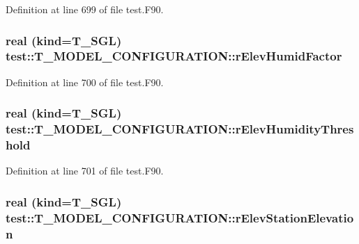 Definition at line 699 of file test.F90.

\hypertarget{typetest_1_1_t___m_o_d_e_l___c_o_n_f_i_g_u_r_a_t_i_o_n_abf728571c92516aee194d82c9bd9017e}{
\subsubsection[{rElevHumidFactor}]{\setlength{\rightskip}{0pt plus 5cm}real (kind={\bf T\_\-SGL}) {\bf test::T\_\-MODEL\_\-CONFIGURATION::rElevHumidFactor}}}
\label{typetest_1_1_t___m_o_d_e_l___c_o_n_f_i_g_u_r_a_t_i_o_n_abf728571c92516aee194d82c9bd9017e}


Definition at line 700 of file test.F90.

\hypertarget{typetest_1_1_t___m_o_d_e_l___c_o_n_f_i_g_u_r_a_t_i_o_n_ace5e03b5eb7f036eb315d329cb80d238}{
\subsubsection[{rElevHumidityThreshold}]{\setlength{\rightskip}{0pt plus 5cm}real (kind={\bf T\_\-SGL}) {\bf test::T\_\-MODEL\_\-CONFIGURATION::rElevHumidityThreshold}}}
\label{typetest_1_1_t___m_o_d_e_l___c_o_n_f_i_g_u_r_a_t_i_o_n_ace5e03b5eb7f036eb315d329cb80d238}


Definition at line 701 of file test.F90.

\hypertarget{typetest_1_1_t___m_o_d_e_l___c_o_n_f_i_g_u_r_a_t_i_o_n_a193e6b6383fe1b9dfdef433889a4ca46}{
\subsubsection[{rElevStationElevation}]{\setlength{\rightskip}{0pt plus 5cm}real (kind={\bf T\_\-SGL}) {\bf test::T\_\-MODEL\_\-CONFIGURATION::rElevStationElevation}}}
\label{typetest_1_1_t___m_o_d_e_l___c_o_n_f_i_g_u_r_a_t_i_o_n_a193e6b6383fe1b9dfdef433889a4ca46}


